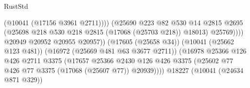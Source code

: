 \begin{lexlean}{RustStd}
\begin{coremodule}
                                                          (@10041 (@17156 @3961 @2711))))
                                                      (@25690
                                                        @223
                                                        @82
                                                        @530
                                                        @14
                                                        @2815
                                                        @2695
                                                        (@25698
                                                          @218
                                                          @530
                                                          @218
                                                          @2815
                                                          (@17068 (@25703 @218))
                                                          @18013)
                                                        @25769))))
                                                @20949
                                                @20952
                                                @20955
                                                @20957))
                                            (@17605 (@25658 @34))
                                            (@10041 (@25662 @123 @481))
                                            (@16972 (@25669 @481 @63 @3677 @2711))
                                            (@16978
                                              @25366
                                              @126
                                              @426
                                              @2711
                                              @3375
                                              (@17657
                                                @25366
                                                @2430
                                                @126
                                                @426
                                                @3375
                                                (@25602
                                                  @77
                                                  @426
                                                  @77
                                                  @3375
                                                  (@17068 (@25607 @77))
                                                  @20939))))
                                          @18227
                                          (@10041 (@24634 @871 @329))

\end{coremodule}
\end{lexlean}
